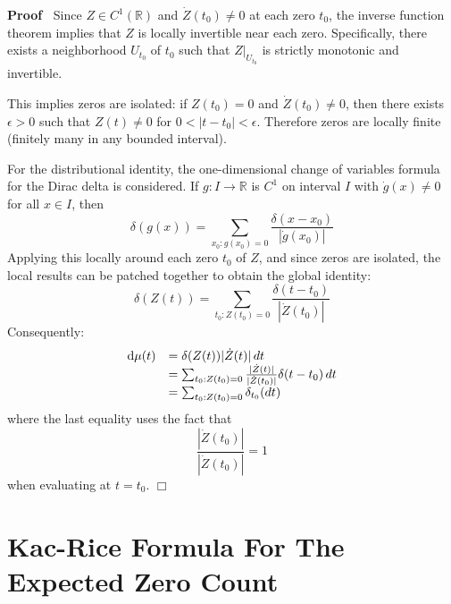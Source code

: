 \documentclass{article}
\newcommand{\mathd}{\mathrm{d}}
\newenvironment{proof}{\noindent\textbf{Proof\ }}{\hspace*{\fill}$\Box$\medskip}
\begin{document}
\begin{proof}
  Since $Z \in C^1 (\mathbb{R})$ and $\dot{Z} (t_0) \neq 0$ at each zero
  $t_0$, the inverse function theorem implies that $Z$ is locally invertible
  near each zero. Specifically, there exists a neighborhood $U_{t_0}$ of $t_0$
  such that $Z|_{U_{t_0}}$ is strictly monotonic and invertible.
  
  This implies zeros are isolated: if $Z (t_0) = 0$ and $\dot{Z} (t_0) \neq
  0$, then there exists $\epsilon > 0$ such that $Z (t) \neq 0$ for $0 < |t -
  t_0 | < \epsilon$. Therefore zeros are locally finite (finitely many in any
  bounded interval).
  
  For the distributional identity, the one-dimensional change of variables
  formula for the Dirac delta is considered. If $g : I \to \mathbb{R}$ is
  $C^1$ on interval $I$ with $\dot{g} (x) \neq 0$ for all $x \in I$, then
  \begin{equation}
    \delta (g (x)) = \sum_{x_0 : g (x_0) = 0} \frac{\delta (x - x_0)}{|
    \dot{g} (x_0) |}
  \end{equation}
  Applying this locally around each zero $t_0$ of $Z$, and since zeros are
  isolated, the local results can be patched together to obtain the global
  identity:
  \begin{equation}
    \delta (Z (t)) = \sum_{t_0 : Z (t_0) = 0} \frac{\delta (t - t_0)}{|
    \dot{Z} (t_0) |}
  \end{equation}
  Consequently:
  \begin{equation}
    \begin{array}{ll}
      \mathd \mu (t) & = \delta (Z (t)) | \dot{Z} (t) |  \hspace{0.17em} dt\\
      & = \sum_{t_0 : Z (t_0) = 0} \frac{| \dot{Z} (t) |}{| \dot{Z} (t_0) |}
      \delta (t - t_0)  \hspace{0.17em} dt\\
      & = \sum_{t_0 : Z (t_0) = 0} \delta_{t_0}  (dt)
    \end{array}
  \end{equation}
  where the last equality uses the fact that
  \begin{equation}
    \frac{| \dot{Z} (t_0) |}{| \dot{Z} (t_0) |} = 1
  \end{equation}
  when evaluating at $t = t_0$.
\end{proof}

\section{Kac-Rice Formula For The Expected Zero Count}
\end{document}
